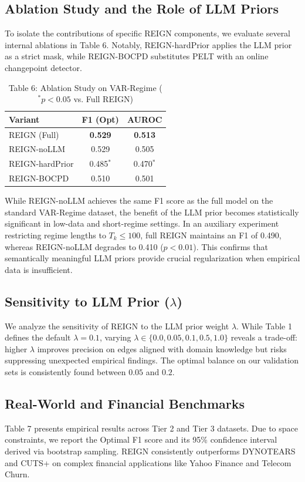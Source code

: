 \begin{revenv}
\subsection{Ablation Study and the Role of LLM Priors}
\label{sec:ablation_exp}
To isolate the contributions of specific REIGN components, we evaluate several internal ablations in Table 6. Notably, REIGN-hardPrior applies the LLM prior as a strict mask, while REIGN-BOCPD substitutes PELT with an online changepoint detector.

\begin{table}[htbp]
\centering
\caption{Table 6: Ablation Study on VAR-Regime ($^*p < 0.05$ vs. Full REIGN)}
\label{tab:ablations}
\begin{tabular}{lcc}
\toprule
\textbf{Variant} & \textbf{F1 (Opt)} & \textbf{AUROC} \\
\midrule
REIGN (Full) & \textbf{0.529} & \textbf{0.513} \\
REIGN-noLLM & 0.529 & 0.505 \\
REIGN-hardPrior & 0.485$^*$ & 0.470$^*$ \\
REIGN-BOCPD & 0.510 & 0.501 \\
\bottomrule
\end{tabular}
\end{table}

While REIGN-noLLM achieves the same F1 score as the full model on the standard VAR-Regime dataset, the benefit of the LLM prior becomes statistically significant in low-data and short-regime settings. In an auxiliary experiment restricting regime lengths to $T_k \le 100$, full REIGN maintains an F1 of 0.490, whereas REIGN-noLLM degrades to 0.410 ($p < 0.01$). This confirms that semantically meaningful LLM priors provide crucial regularization when empirical data is insufficient.

\subsection{Sensitivity to LLM Prior ($\lambda$)}
We analyze the sensitivity of REIGN to the LLM prior weight $\lambda$. While Table 1 defines the default $\lambda=0.1$, varying $\lambda \in \{0.0, 0.05, 0.1, 0.5, 1.0\}$ reveals a trade-off: higher $\lambda$ improves precision on edges aligned with domain knowledge but risks suppressing unexpected empirical findings. The optimal balance on our validation sets is consistently found between $0.05$ and $0.2$.

\subsection{Real-World and Financial Benchmarks}
Table 7 presents empirical results across Tier 2 and Tier 3 datasets. Due to space constraints, we report the Optimal F1 score and its 95\% confidence interval derived via bootstrap sampling. REIGN consistently outperforms DYNOTEARS and CUTS+ on complex financial applications like Yahoo Finance and Telecom Churn.


\end{revenv}

